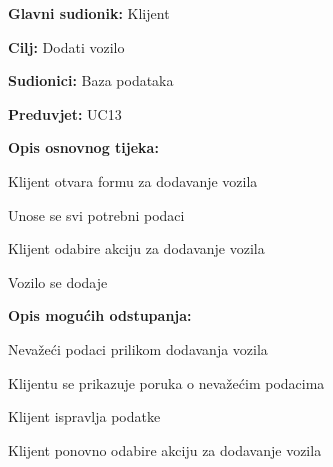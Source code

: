\noindent {}
\begin{packed_item}

	\item \textbf{Glavni sudionik:} Klijent
	\item \textbf{Cilj:} Dodati vozilo
	\item \textbf{Sudionici:} Baza podataka
	\item \textbf{Preduvjet:} UC13
	\item \textbf{Opis osnovnog tijeka:}
	
	\item[] \begin{packed_enum}
		
		\item Klijent otvara formu za dodavanje vozila
		\item Unose se svi potrebni podaci
		\item Klijent odabire akciju za dodavanje vozila
		\item Vozilo se dodaje

	\end{packed_enum}
	
	\item  \textbf{Opis mogućih odstupanja:}
	
	\item[] \begin{packed_item}
		
		\item[2.a] Nevažeći podaci prilikom dodavanja vozila
		\item[] \begin{packed_enum}
			
			\item Klijentu se prikazuje poruka o nevažećim podacima
			\item Klijent ispravlja podatke
			\item Klijent ponovno odabire akciju za dodavanje vozila
			
		\end{packed_enum}
		
	\end{packed_item}
\end{packed_item}

\pagebreak

